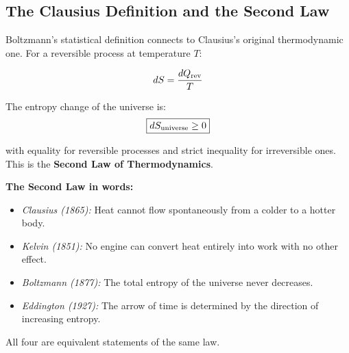 \documentclass[12pt, a4paper, twoside]{book}
\begin{document}
\subsection{The Clausius Definition and the Second Law}

Boltzmann's statistical definition connects to Clausius's original thermodynamic one. For a reversible process at temperature $T$:

\begin{equation}
  dS = \frac{dQ_{\rm rev}}{T}
\end{equation}

The entropy change of the universe is:
\begin{equation}
  \boxed{dS_{\rm universe} \geq 0}
\end{equation}

with equality for reversible processes and strict inequality for irreversible ones. This is the \textbf{Second Law of Thermodynamics}.

\begin{namebox}
\textbf{The Second Law in words:}
\begin{itemize}[leftmargin=1.5em,itemsep=3pt]
  \item \textit{Clausius (1865):} Heat cannot flow spontaneously from a colder to a hotter body.
  \item \textit{Kelvin (1851):} No engine can convert heat entirely into work with no other effect.
  \item \textit{Boltzmann (1877):} The total entropy of the universe never decreases.
  \item \textit{Eddington (1927):} The arrow of time is determined by the direction of increasing entropy.
\end{itemize}
All four are equivalent statements of the same law.
\end{namebox}
\end{document}
